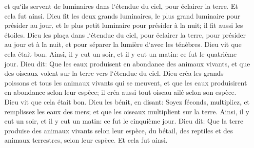\verse et qu`ils servent de luminaires dans l`étendue du ciel, pour éclairer la terre. Et cela fut ainsi. 
\verse Dieu fit les deux grands luminaires, le plus grand luminaire pour présider au jour, et le plus petit luminaire pour présider à la nuit; il fit aussi les étoiles. 
\verse Dieu les plaça dans l`étendue du ciel, pour éclairer la terre, 
\verse pour présider au jour et à la nuit, et pour séparer la lumière d`avec les ténèbres. Dieu vit que cela était bon. 
\verse Ainsi, il y eut un soir, et il y eut un matin: ce fut le quatrième jour. 
\verse Dieu dit: Que les eaux produisent en abondance des animaux vivants, et que des oiseaux volent sur la terre vers l`étendue du ciel. 
\verse Dieu créa les grands poissons et tous les animaux vivants qui se meuvent, et que les eaux produisirent en abondance selon leur espèce; il créa aussi tout oiseau ailé selon son espèce. Dieu vit que cela était bon. 
\verse Dieu les bénit, en disant: Soyez féconds, multipliez, et remplissez les eaux des mers; et que les oiseaux multiplient sur la terre. 
\verse Ainsi, il y eut un soir, et il y eut un matin: ce fut le cinquième jour. 
\verse Dieu dit: Que la terre produise des animaux vivants selon leur espèce, du bétail, des reptiles et des animaux terrestres, selon leur espèce. Et cela fut ainsi. 
